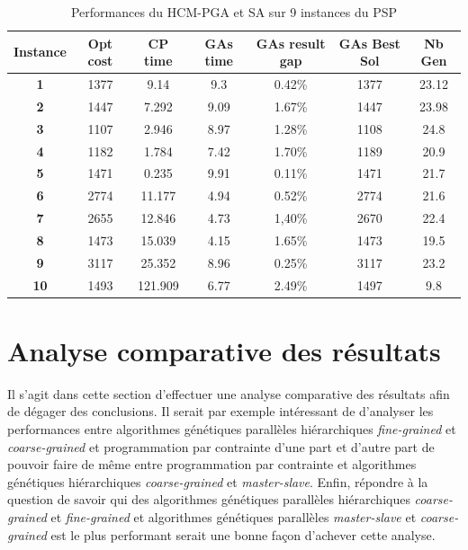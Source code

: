 \documentclass[12pt,a4paper]{article}
\begin{document}
	\begin{table}[h]
		\centering
		\begin{tabular}{|c|c|c|c|c|c|c|}
			\hline
			\textbf{Instance} & \textbf{Opt cost} & \textbf{CP time} & \textbf{GAs time} & \textbf{GAs result gap} & \textbf{GAs Best Sol} & \textbf{Nb Gen}\\
			\hline
			\textbf{1} & 1377 & 9.14 & 9.3 & 0.42\% & 1377 & 23.12 \\
			\textbf{2} & 1447 & 7.292 & 9.09 & 1.67\% & 1447 & 23.98\\
			\textbf{3} & 1107 & 2.946 & 8.97 & 1.28\% & 1108 & 24.8\\
			\textbf{4} & 1182 & 1.784 & 7.42 & 1.70\% & 1189 & 20.9\\
			\textbf{5} & 1471 & 0.235 & 9.91 & 0.11\% & 1471 & 21.7\\
			\textbf{6} & 2774 & 11.177 & 4.94 & 0.52\% & 2774 & 21.6\\
			\textbf{7} & 2655 & 12.846 & 4.73 & 1,40\% & 2670 & 22.4\\
			\textbf{8} & 1473 & 15.039 & 4.15 & 1.65\% & 1473 & 19.5\\
			\textbf{9} & 3117 & 25.352 & 8.96 & 0.25\% & 3117 & 23.2\\
			\textbf{10} & 1493 & 121.909 & 6.77 & 2.49\% & 1497 & 9.8\\
			\hline
		\end{tabular}	
		\caption{Performances du HCM-PGA et SA sur 9 instances du PSP}	
	\end{table}					
	
		\section{Analyse comparative des résultats}
		Il s'agit dans cette section d'effectuer une analyse comparative des résultats afin de dégager des conclusions. Il serait par exemple intéressant de d'analyser les performances entre algorithmes génétiques parallèles hiérarchiques \emph{fine-grained} et \emph{coarse-grained} et programmation par contrainte d'une part et d'autre part de pouvoir faire de même entre programmation par contrainte et algorithmes génétiques hiérarchiques \emph{coarse-grained} et \emph{master-slave}. Enfin, répondre à la question de savoir qui des algorithmes génétiques parallèles hiérarchiques \emph{coarse-grained} et \emph{fine-grained} et algorithmes génétiques parallèles \emph{master-slave} et \emph{coarse-grained} est le plus performant serait une bonne façon d'achever cette analyse.
		
\end{document}
